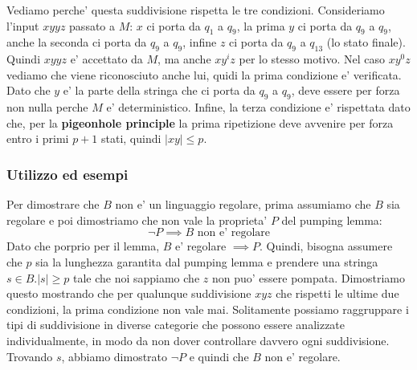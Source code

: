 Vediamo perche' questa suddivisione rispetta le tre condizioni. Consideriamo l'input $ xyyz $ passato a $ M $: $ x $ ci porta da $ q_1  $ a $ q_9 $, la prima $ y $ ci porta da $ q_9 $ a $ q_9 $, anche la seconda ci porta da $ q_9 $ a $ q_9 $, infine $ z $ ci porta da $ q_9 $ a $ q_{13} $ (lo stato finale). Quindi $ xyyz $ e' accettato da $ M $, ma anche $ xy^iz $ per lo stesso motivo. Nel caso $ xy^0z $ vediamo che viene riconosciuto anche lui, quidi la prima condizione e' verificata. Dato che $ y $ e' la parte della stringa che ci porta da $ q_9 $ a $ q_9 $, deve essere per forza non nulla perche $ M $ e' deterministico. Infine, la terza condizione e' rispettata dato che, per la \textbf{pigeonhole principle} la prima ripetizione deve avvenire per forza entro i primi $ p+1 $ stati, quindi $ |xy| \leq p $.


\subsubsection{Utilizzo ed esempi}
Per dimostrare che $ B $ non e' un linguaggio regolare, prima assumiamo che $ B $ sia regolare e poi dimostriamo che non vale la proprieta' $ P $ del pumping lemma:
\[
\lnot P \implies B \text{ non e' regolare}
\]
Dato che porprio per il lemma, $ B $ e' regolare $ \implies P $. Quindi, bisogna assumere che $ p $ sia la lunghezza garantita dal pumping lemma e prendere una stringa $ s \in B. |s| \geq p $ tale che noi sappiamo che $ z $ non puo' essere pompata. Dimostriamo questo mostrando che per qualunque suddivisione $ xyz $ che rispetti le ultime due condizioni, la prima condizione non vale mai. Solitamente possiamo raggruppare i tipi di suddivisione in diverse categorie che possono essere analizzate individualmente, in modo da non dover controllare davvero ogni suddivisione. Trovando $ s $, abbiamo dimostrato $ \lnot P $ e quindi che $ B $ non e' regolare. 

